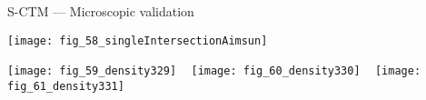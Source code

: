 \begin{frame}{S-CTM --- Microscopic validation}
    \begin{center}
    \texttt{[image: fig\_58\_singleIntersectionAimsun]}
    \end{center}
    \begin{center}
    \centering
    \texttt{[image: fig\_59\_density329]}
    ~
    \texttt{[image: fig\_60\_density330]}
    ~
    \texttt{[image: fig\_61\_density331]}
    \end{center}
\end{frame}